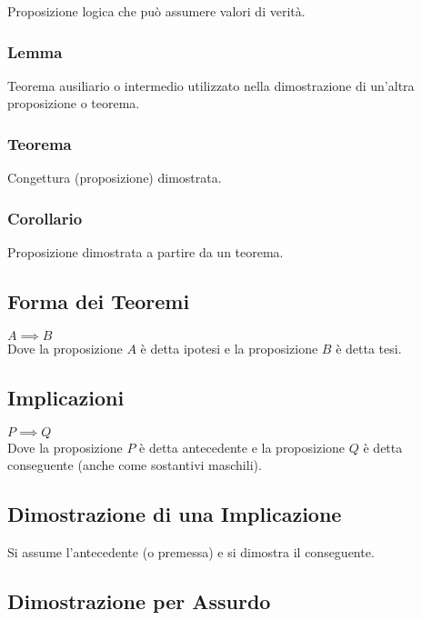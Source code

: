 \documentclass[a4paper, twoside, italian, 11pt]{book}
\begin{document}
\noindent
Proposizione logica che può assumere valori di verità.


\subsubsection{Lemma}

\noindent
Teorema ausiliario o intermedio utilizzato nella dimostrazione di un'altra proposizione o teorema.


\subsubsection{Teorema}

\noindent
Congettura (proposizione) dimostrata.


\subsubsection{Corollario}

\noindent
Proposizione dimostrata a partire da un teorema.


\subsection{Forma dei Teoremi}

\noindent
$A \implies B$ \\

\noindent
Dove la proposizione $A$ è detta ipotesi e la proposizione $B$ è detta tesi.


\subsection{Implicazioni}

\noindent
$P \implies Q$ \\

\noindent
Dove la proposizione $P$ è detta antecedente e la proposizione $Q$ è detta conseguente (anche come sostantivi maschili).


\subsection{Dimostrazione di una Implicazione}

\noindent
Si assume l'antecedente (o premessa) e si dimostra il conseguente.


\subsection{Dimostrazione per Assurdo}
\end{document}
